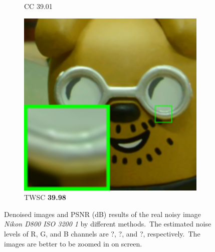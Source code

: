 \begin{figure}
\begin{subfigure}[t]{0.19\textwidth}
		\caption{CC 39.01}
    \end{subfigure}
    \hfill
    \begin{subfigure}[t]{0.19\textwidth}
        \centering
        \includegraphics[width=1\textwidth]{images/twsc/cc/resize_br_TWSC_d800_iso3200_1.png}
		\caption{TWSC \textbf{39.98}}
    \end{subfigure}
    \caption{Denoised images and PSNR (dB) results of the real noisy image \textsl{Nikon D800 ISO 3200 1} \cite{crosschannel2016} by different methods.\ The estimated noise levels of R, G, and B channels are ?, ?, and ?, respectively.\ The images are better to be zoomed in on screen.}
    \label{fig3}
\end{figure}



